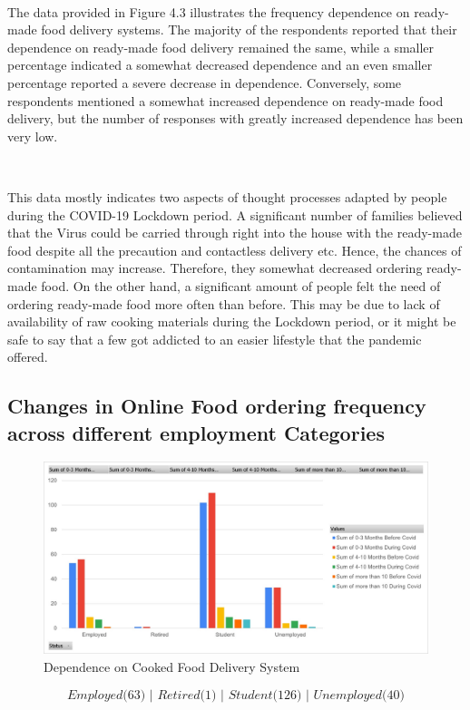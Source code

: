 \

The data provided in Figure 4.3 illustrates the frequency dependence on ready-made food delivery systems. The majority of the respondents reported that their dependence on ready-made food delivery remained the same, while a smaller percentage indicated a somewhat decreased dependence and an even smaller percentage reported a severe decrease in dependence. Conversely, some respondents mentioned a somewhat increased dependence on ready-made food delivery, but the number of responses with greatly increased dependence has been very low.

\ 

This data mostly indicates two aspects of thought processes adapted by people during the COVID-19 Lockdown period. A significant number of families believed that the Virus could be carried through right into the house with the ready-made food despite all the precaution and contactless delivery etc. Hence, the chances of contamination may increase. Therefore, they somewhat decreased ordering ready-made food. On the other hand, a significant amount of people felt the need of ordering ready-made food more often than before. This may be due to lack of availability of raw cooking materials during the Lockdown period, or it might be safe to say that a few got addicted to an easier lifestyle that the pandemic offered.

\newpage

\subsection{Changes in Online Food ordering frequency \\ across different employment Categories}
\begin{figure}[h!]
	\centering
	\includegraphics[width=0.9\linewidth]{IMAGES/Image 6.jpg}
	\caption{Dependence on Cooked Food Delivery System}
	\label{G6}
\end{figure}
$$\textit{Employed($63$) | Retired($1$) | Student($126$) | Unemployed($40$)}$$

